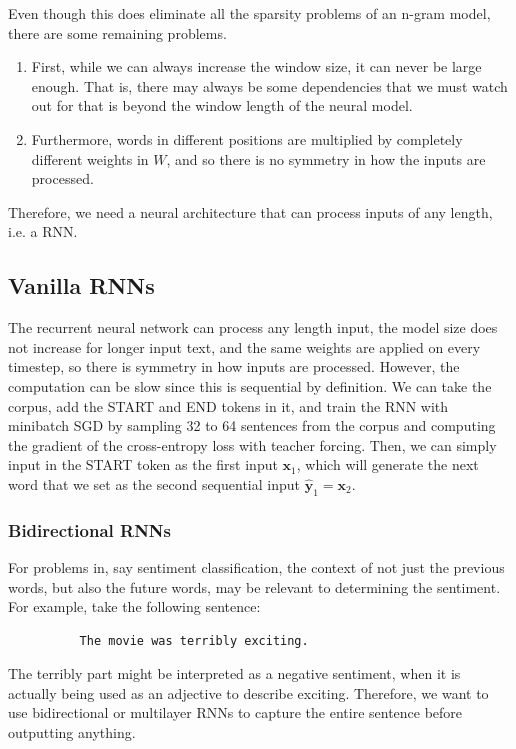 \documentclass{article}
\begin{document}
    Even though this does eliminate all the sparsity problems of an n-gram model, there are some remaining problems. 
    \begin{enumerate}
        \item First, while we can always increase the window size, it can never be large enough. That is, there may always be some dependencies that we must watch out for that is beyond the window length of the neural model. 
        \item Furthermore, words in different positions are multiplied by completely different weights in $W$, and so there is no symmetry in how the inputs are processed. 
    \end{enumerate}
    Therefore, we need a neural architecture that can process inputs of any length, i.e. a RNN. 

  \subsection{Vanilla RNNs}

    The recurrent neural network can process any length input, the model size does not increase for longer input text, and the same weights are applied on every timestep, so there is symmetry in how inputs are processed. However, the computation can be slow since this is sequential by definition. We can take the corpus, add the START and END tokens in it, and train the RNN with minibatch SGD by sampling 32 to 64 sentences from the corpus and computing the gradient of the cross-entropy loss with teacher forcing. Then, we can simply input in the START token as the first input $\mathbf{x}_1$, which will generate the next word that we set as the second sequential input $\hat{\mathbf{y}}_1 = \mathbf{x}_2$. 

    \subsubsection{Bidirectional RNNs}

      For problems in, say sentiment classification, the context of not just the previous words, but also the future words, may be relevant to determining the sentiment. For example, take the following sentence: 
      \begin{lstlisting}
          The movie was terribly exciting. 
      \end{lstlisting}
      The terribly part might be interpreted as a negative sentiment, when it is actually being used as an adjective to describe exciting. Therefore, we want to use bidirectional or multilayer RNNs to capture the entire sentence before outputting anything. 
\end{document}
